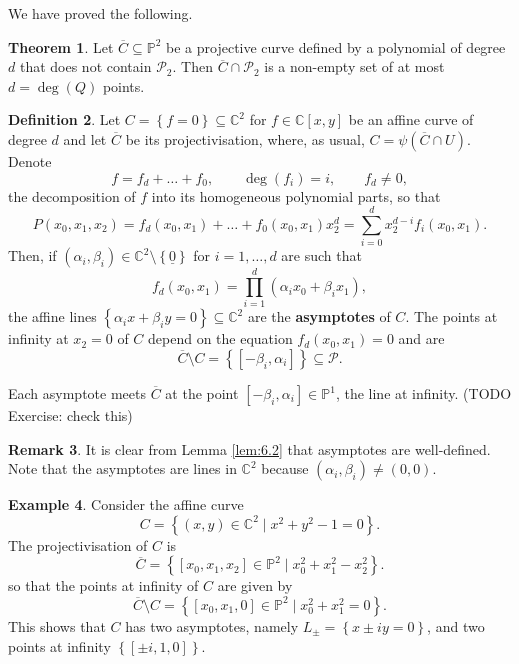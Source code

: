 \documentclass{article}
\newcommand{\C}{\mathbb{C}}
\renewcommand{\P}{\mathbb{P}}
\newcommand{\rb}[1]{\left( #1 \right)}
\renewcommand{\sb}[1]{\left[ #1 \right]}
\newcommand{\cb}[1]{\left\{ #1 \right\}}
\theoremstyle{definition}\newtheorem{definition}{Definition}[section]
\theoremstyle{definition}\newtheorem{notation}[definition]{Notation}
\theoremstyle{definition}\newtheorem{remark}[definition]{Remark}
\theoremstyle{definition}\newtheorem{example}[definition]{Example}
\theoremstyle{definition}\newtheorem{fact}{Fact}
\theoremstyle{definition}\newtheorem{exercise}{Exercise}
\newtheorem{theorem}[definition]{Theorem}
\begin{document}
We have proved the following.

\begin{theorem}
Let $ \overline{C} \subseteq \P^2 $ be a projective curve defined by a polynomial of degree $ d $ that does not contain $ \mathcal{P}_2 $. Then $ \overline{C} \cap \mathcal{P}_2 $ is a non-empty set of at most $ d = \deg\rb{Q} $ points.
\end{theorem}

\begin{definition}
Let $ C = \cb{f = 0} \subseteq \C^2 $ for $ f \in \C\sb{x, y} $ be an affine curve of degree $ d $ and let $ \overline{C} $ be its projectivisation, where, as usual, $ C = \psi\rb{\overline{C} \cap U} $. Denote
$$ f = f_d + \dots + f_0, \qquad \deg\rb{f_i} = i, \qquad f_d \ne 0, $$
the decomposition of $ f $ into its homogeneous polynomial parts, so that
$$ P\rb{x_0, x_1, x_2} = f_d\rb{x_0, x_1} + \dots + f_0\rb{x_0, x_1}x_2^d = \sum_{i = 0}^d x_2^{d - i}f_i\rb{x_0, x_1}. $$
Then, if $ \rb{\alpha_i, \beta_i} \in \C^2 \setminus \cb{\underline{0}} $ for $ i = 1, \dots, d $ are such that
$$ f_d\rb{x_0, x_1} = \prod_{i = 1}^d \rb{\alpha_ix_0 + \beta_ix_1}, $$
the affine lines $ \cb{\alpha_ix + \beta_iy = 0} \subseteq \C^2 $ are the \textbf{asymptotes} of $ C $. The points at infinity at $ x_2 = 0 $ of $ C $ depend on the equation $ f_d\rb{x_0, x_1} = 0 $ and are
$$ \overline{C} \setminus C = \cb{\sb{-\beta_i, \alpha_i}} \subseteq \mathcal{P}. $$
\end{definition}

Each asymptote meets $ \overline{C} $ at the point $ \sb{-\beta_i, \alpha_i} \in \P^1 $, the line at infinity. (TODO Exercise: check this)

\begin{remark}
It is clear from Lemma \ref{lem:6.2} that asymptotes are well-defined. Note that the asymptotes are lines in $ \C^2 $ because $ \rb{\alpha_i, \beta_i} \ne \rb{0, 0} $.
\end{remark}

\begin{example}
Consider the affine curve
$$ C = \cb{\rb{x, y} \in \C^2 \mid x^2 + y^2 - 1 = 0}. $$
The projectivisation of $ C $ is
$$ \overline{C} = \cb{\sb{x_0, x_1, x_2} \in \P^2 \mid x_0^2 + x_1^2 - x_2^2}. $$
so that the points at infinity of $ C $ are given by
$$ \overline{C} \setminus C = \cb{\sb{x_0, x_1, 0} \in \P^2 \mid x_0^2 + x_1^2 = 0}. $$
This shows that $ C $ has two asymptotes, namely $ L_\pm = \cb{x \pm iy = 0} $, and two points at infinity $ \cb{\sb{\pm i, 1, 0}} $.
\end{example}
\end{document}
